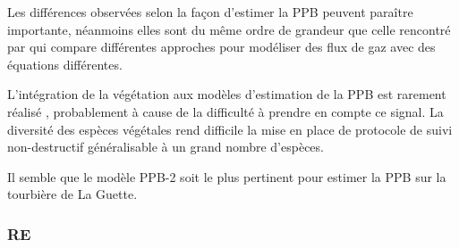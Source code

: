 Les différences observées selon la façon d'estimer la PPB peuvent paraître importante, néanmoins elles sont du même ordre de grandeur que celle rencontré par \citet{worrall2009} qui compare différentes approches pour modéliser des flux de gaz avec des équations différentes.

L'intégration de la végétation aux modèles d'estimation de la PPB est rarement réalisé \citep{bortoluzzi2006a,gorres2014}, probablement à cause de la difficulté à prendre en compte ce signal.
La diversité des espèces végétales rend difficile la mise en place de protocole de suivi non-destructif généralisable à un grand nombre d'espèces.

Il semble que le modèle PPB-2 soit le plus pertinent pour estimer la PPB sur la tourbière de La Guette.

%



\subsubsection{RE}

